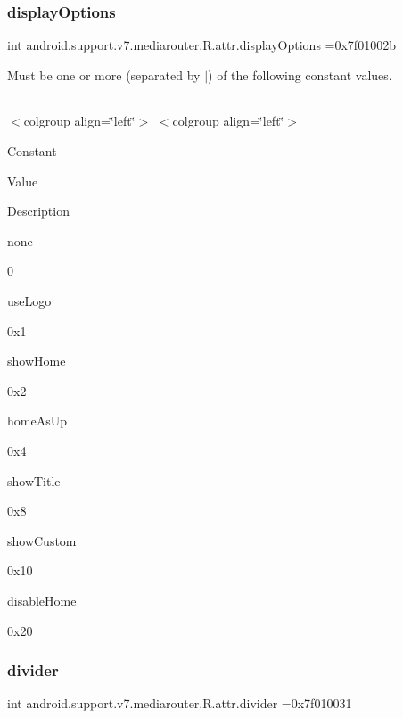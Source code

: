 \subsubsection{\texorpdfstring{display\+Options}{displayOptions}}
{\footnotesize\ttfamily int android.\+support.\+v7.\+mediarouter.\+R.\+attr.\+display\+Options =0x7f01002b\hspace{0.3cm}{\ttfamily [static]}}

Must be one or more (separated by \textquotesingle{}$\vert$\textquotesingle{}) of the following constant values.

\tabulinesep=1mm
\begin{longtabu} spread 0pt [c]{*{0}{|X[-1]}|}
\hline
\end{longtabu}
$<$colgroup align=\char`\"{}left\char`\"{}$>$ $<$colgroup align=\char`\"{}left\char`\"{}$>$ 

Constant

Value

Description 

{\ttfamily none}

0

{\ttfamily use\+Logo}

0x1

{\ttfamily show\+Home}

0x2

{\ttfamily home\+As\+Up}

0x4

{\ttfamily show\+Title}

0x8

{\ttfamily show\+Custom}

0x10

{\ttfamily disable\+Home}

0x20\mbox{\label{classandroid_1_1support_1_1v7_1_1mediarouter_1_1R_1_1attr_a8be8d169a154b716f3840650590a48f2}} 
\subsubsection{\texorpdfstring{divider}{divider}}
{\footnotesize\ttfamily int android.\+support.\+v7.\+mediarouter.\+R.\+attr.\+divider =0x7f010031\hspace{0.3cm}{\ttfamily [static]}}

